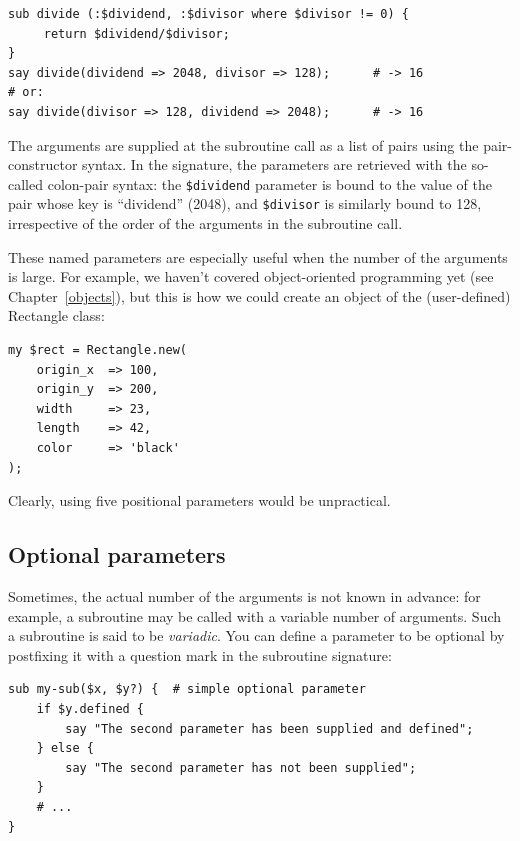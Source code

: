 \begin{verbatim}
sub divide (:$dividend, :$divisor where $divisor != 0) {
     return $dividend/$divisor;
}
say divide(dividend => 2048, divisor => 128);      # -> 16
# or:
say divide(divisor => 128, dividend => 2048);      # -> 16
\end{verbatim}

The arguments are supplied at the subroutine call as a list of 
pairs using the pair-constructor syntax. In the signature, 
the parameters are retrieved with the 
so-called colon-pair syntax: the \verb'$dividend' parameter is 
bound to the value of the pair whose key is ``dividend'' (2048), 
and \verb'$divisor' is similarly bound to 128, irrespective of 
the order of the arguments in the subroutine call.

These named parameters are especially useful when the number of 
the arguments is large. For example, we haven't covered 
object-oriented programming yet (see Chapter~\ref{objects}), 
but this is how we could create an object of the 
(user-defined) Rectangle class:

\begin{verbatim}
my $rect = Rectangle.new( 
    origin_x  => 100, 
    origin_y  => 200, 
    width     => 23,
    length    => 42,
    color     => 'black'
);
\end{verbatim}

Clearly, using five positional parameters would be unpractical. 

\subsection{Optional parameters}

Sometimes, the actual number of the arguments is not known 
in advance: for example, a subroutine may be called with 
a variable number of arguments. Such a subroutine is said 
to be \emph{variadic}. You can define a parameter to be 
optional by postfixing it with a question mark in the 
subroutine signature:

\begin{verbatim}
sub my-sub($x, $y?) {  # simple optional parameter
    if $y.defined {
        say "The second parameter has been supplied and defined";
    } else {
        say "The second parameter has not been supplied";
    }
    # ...
}
\end{verbatim}

